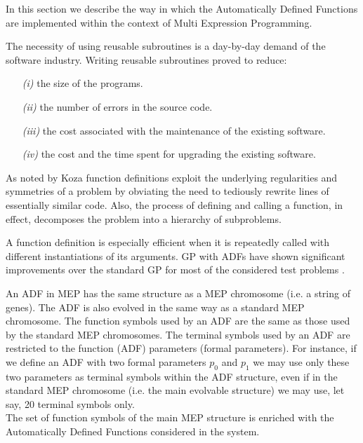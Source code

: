 \documentclass [11pt]{article}
\begin{document}
In this section we describe the way in which the Automatically Defined 
Functions \cite{koza2} are implemented within the context of Multi Expression 
Programming.

The necessity of using reusable subroutines is a day-by-day demand of the 
software industry. Writing reusable subroutines proved to reduce:

\begin{itemize}

\item[{\it (i)}]{the size of the programs.}

\item[{\it (ii)}]{the number of errors in the source code.}

\item[{\it (iii)}]{the cost associated with the maintenance of the existing software.}

\item[{\it (iv)}]{the cost and the time spent for upgrading the existing software.}

\end{itemize}

As noted by Koza \cite{koza2} function definitions exploit the underlying 
regularities and symmetries of a problem by obviating the need to tediously 
rewrite lines of essentially similar code. Also, the process of defining and 
calling a function, in effect, decomposes the problem into a hierarchy of 
subproblems.

A function definition is especially efficient when it is repeatedly called 
with different instantiations of its arguments. GP with ADFs have shown 
significant improvements over the standard GP for most of the considered 
test problems \cite{koza1,koza2}.

An ADF in MEP has the same structure as a MEP chromosome (i.e. a string of 
genes). The ADF is also evolved in the same way as a standard MEP chromosome. The function symbols used by an ADF are the same as those used by the standard MEP chromosomes. The terminal symbols used by an 
ADF are restricted to the function (ADF) parameters (formal parameters). For 
instance, if we define an ADF with two formal parameters $p_{0}$ and 
$p_{1}$ we may use only these two parameters as terminal symbols within the 
ADF structure, even if in the standard MEP chromosome (i.e. the main 
evolvable structure) we may use, let say, 20 terminal symbols only.\\

The set of function symbols of the main MEP structure is enriched with the 
Automatically Defined Functions considered in the system.\\
\end{document}
